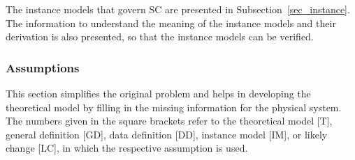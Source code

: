 \documentclass[12pt]{article}
\begin{document}
The instance models that govern SC are presented in
Subsection~\ref{sec_instance}.  The information to understand the meaning of the
instance models and their derivation is also presented, so that the instance
models can be verified.

\subsubsection{Assumptions} \label{sec_assumpt}

This section simplifies the original problem and helps in developing the
theoretical model by filling in the missing information for the physical
system. The numbers given in the square brackets refer to the theoretical model
[T], general definition [GD], data definition [DD], instance model [IM], or
likely change [LC], in which the respective assumption is used.
\end{document}
